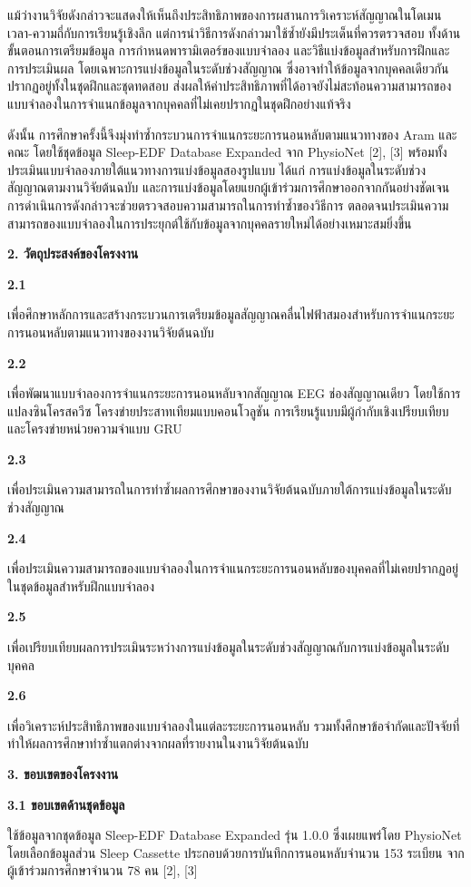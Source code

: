 \documentclass[12pt,a4paper]{article}
\newcommand{\mainsection}[1]{%
  \par\vspace{0.65\baselineskip}%
  \noindent\textbf{#1}\par\nobreak\vspace{0.2\baselineskip}%
}
\newcommand{\subsectionthai}[1]{%
  \par\vspace{0.35\baselineskip}%
  \noindent\textbf{#1}\par\nobreak\vspace{0.1\baselineskip}%
}
\begin{document}
แม้ว่างานวิจัยดังกล่าวจะแสดงให้เห็นถึงประสิทธิภาพของการผสานการวิเคราะห์สัญญาณในโดเมนเวลา-ความถี่กับการเรียนรู้เชิงลึก แต่การนำวิธีการดังกล่าวมาใช้ซ้ำยังมีประเด็นที่ควรตรวจสอบ ทั้งด้านขั้นตอนการเตรียมข้อมูล การกำหนดพารามิเตอร์ของแบบจำลอง และวิธีแบ่งข้อมูลสำหรับการฝึกและการประเมินผล โดยเฉพาะการแบ่งข้อมูลในระดับช่วงสัญญาณ ซึ่งอาจทำให้ข้อมูลจากบุคคลเดียวกันปรากฏอยู่ทั้งในชุดฝึกและชุดทดสอบ ส่งผลให้ค่าประสิทธิภาพที่ได้อาจยังไม่สะท้อนความสามารถของแบบจำลองในการจำแนกข้อมูลจากบุคคลที่ไม่เคยปรากฏในชุดฝึกอย่างแท้จริง

ดังนั้น การศึกษาครั้งนี้จึงมุ่งทำซ้ำกระบวนการจำแนกระยะการนอนหลับตามแนวทางของ Aram และคณะ โดยใช้ชุดข้อมูล Sleep-EDF Database Expanded จาก PhysioNet [2], [3] พร้อมทั้งประเมินแบบจำลองภายใต้แนวทางการแบ่งข้อมูลสองรูปแบบ ได้แก่ การแบ่งข้อมูลในระดับช่วงสัญญาณตามงานวิจัยต้นฉบับ และการแบ่งข้อมูลโดยแยกผู้เข้าร่วมการศึกษาออกจากกันอย่างชัดเจน การดำเนินการดังกล่าวจะช่วยตรวจสอบความสามารถในการทำซ้ำของวิธีการ ตลอดจนประเมินความสามารถของแบบจำลองในการประยุกต์ใช้กับข้อมูลจากบุคคลรายใหม่ได้อย่างเหมาะสมยิ่งขึ้น

\mainsection{2. วัตถุประสงค์ของโครงงาน}

\subsectionthai{2.1}
เพื่อศึกษาหลักการและสร้างกระบวนการเตรียมข้อมูลสัญญาณคลื่นไฟฟ้าสมองสำหรับการจำแนกระยะการนอนหลับตามแนวทางของงานวิจัยต้นฉบับ

\subsectionthai{2.2}
เพื่อพัฒนาแบบจำลองการจำแนกระยะการนอนหลับจากสัญญาณ EEG ช่องสัญญาณเดียว โดยใช้การแปลงซินโครสควีซ โครงข่ายประสาทเทียมแบบคอนโวลูชัน การเรียนรู้แบบมีผู้กำกับเชิงเปรียบเทียบ และโครงข่ายหน่วยความจำแบบ GRU

\subsectionthai{2.3}
เพื่อประเมินความสามารถในการทำซ้ำผลการศึกษาของงานวิจัยต้นฉบับภายใต้การแบ่งข้อมูลในระดับช่วงสัญญาณ

\subsectionthai{2.4}
เพื่อประเมินความสามารถของแบบจำลองในการจำแนกระยะการนอนหลับของบุคคลที่ไม่เคยปรากฏอยู่ในชุดข้อมูลสำหรับฝึกแบบจำลอง

\subsectionthai{2.5}
เพื่อเปรียบเทียบผลการประเมินระหว่างการแบ่งข้อมูลในระดับช่วงสัญญาณกับการแบ่งข้อมูลในระดับบุคคล

\subsectionthai{2.6}
เพื่อวิเคราะห์ประสิทธิภาพของแบบจำลองในแต่ละระยะการนอนหลับ รวมทั้งศึกษาข้อจำกัดและปัจจัยที่ทำให้ผลการศึกษาทำซ้ำแตกต่างจากผลที่รายงานในงานวิจัยต้นฉบับ

\mainsection{3. ขอบเขตของโครงงาน}

\subsectionthai{3.1 ขอบเขตด้านชุดข้อมูล}

ใช้ข้อมูลจากชุดข้อมูล Sleep-EDF Database Expanded รุ่น 1.0.0 ซึ่งเผยแพร่โดย PhysioNet โดยเลือกข้อมูลส่วน Sleep Cassette ประกอบด้วยการบันทึกการนอนหลับจำนวน 153 ระเบียน จากผู้เข้าร่วมการศึกษาจำนวน 78 คน [2], [3]
\end{document}
